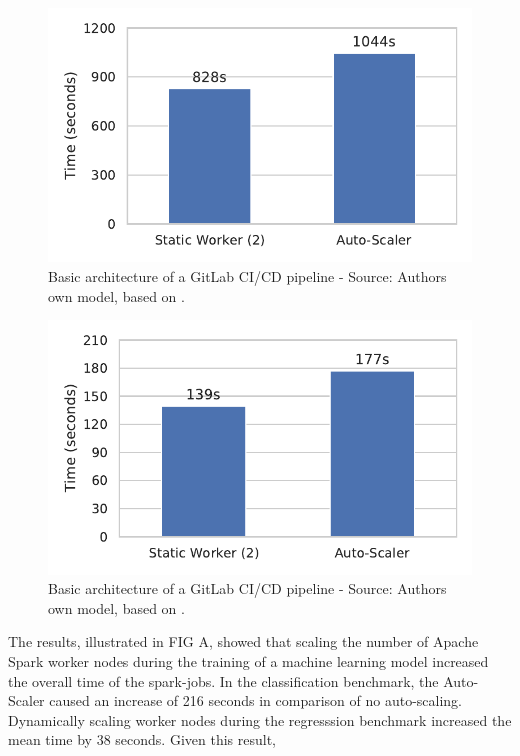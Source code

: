 \begin{figure}[h]
\centering
\includegraphics[scale=1]{images/07_evaluation/mortgage/mortgage_auto_scaler_2_worker}
\caption{Basic architecture of a GitLab CI/CD pipeline - Source: Authors own model, based on \cite{Gitlab2020Docs}.}
\label{fig:07_mortgage_auto-scaler_results}
\end{figure}
\begin{figure}[h]
\centering
\includegraphics[scale=1]{images/07_evaluation/taxi/taxi_auto_scaler_2_worker}
\caption{Basic architecture of a GitLab CI/CD pipeline - Source: Authors own model, based on \cite{Gitlab2020Docs}.}
\label{fig:07_taxi_auto-scaler_results}
\end{figure}
The results, illustrated in FIG A, showed that scaling the number of Apache Spark worker nodes during the training of a machine learning model increased the overall time of the spark-jobs.
In the classification benchmark, the Auto-Scaler caused an increase of 216 seconds in comparison of no auto-scaling.
Dynamically scaling worker nodes during the regresssion benchmark increased the mean time by 38 seconds.
Given this result, 

